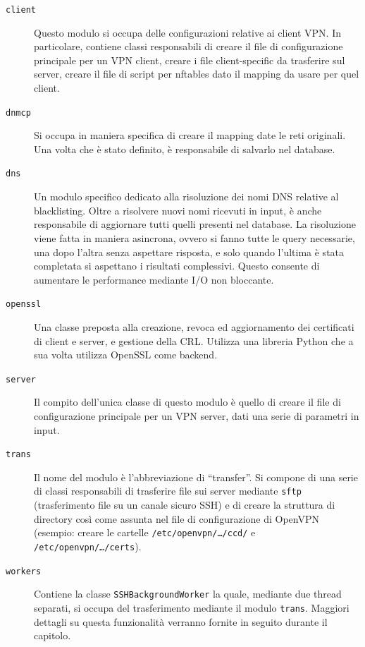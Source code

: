 \begin{description}
	\item[\texttt{client}]Questo modulo si occupa delle configurazioni relative ai
	client VPN. In particolare, contiene classi responsabili di creare il file
	di configurazione principale per un VPN client, creare i file client-specific
	da trasferire sul server, creare il file di script per nftables dato il mapping
	da usare per quel client.
	\item[\texttt{dnmcp}]Si occupa in maniera specifica di creare il mapping date
	le reti originali. Una volta che è stato definito, è responsabile di salvarlo
	nel database.
	\item[\texttt{dns}]Un modulo specifico dedicato alla risoluzione dei nomi
	DNS relative al blacklisting. Oltre a risolvere nuovi nomi ricevuti in input,
	è anche responsabile di aggiornare tutti quelli presenti nel database.
	La risoluzione viene fatta in maniera asincrona, ovvero si fanno tutte le query
	necessarie, una dopo l'altra senza aspettare risposta, e solo quando l'ultima
	è stata completata si aspettano i risultati complessivi. Questo consente
	di aumentare le performance mediante I/O non bloccante.
	\item[\texttt{openssl}]Una classe preposta alla creazione, revoca ed aggiornamento
	dei certificati di client e server, e gestione della CRL. Utilizza una
	libreria Python che a sua volta utilizza OpenSSL come backend.
	\item[\texttt{server}]Il compito dell'unica classe di questo modulo è quello
	di creare il file di configurazione principale per un VPN server, dati una serie
	di parametri in input.
	\item[\texttt{trans}]Il nome del modulo è l'abbreviazione di ``transfer''. Si
	compone di una serie di classi responsabili di trasferire file sui server mediante
	\texttt{sftp} (trasferimento file su un canale sicuro SSH) e di creare
	la struttura di directory così come assunta nel file di configurazione di OpenVPN
	(esempio: creare le cartelle \texttt{/etc/openvpn/\ldots/ccd/} e \texttt{/etc/openvpn/\ldots/certs}).
	\item[\texttt{workers}]Contiene la classe \texttt{SSHBackgroundWorker} la quale, mediante
	due thread separati, si occupa del trasferimento mediante il modulo \texttt{trans}.
	Maggiori dettagli su questa funzionalità verranno fornite in seguito durante
	il capitolo.
\end{description}

